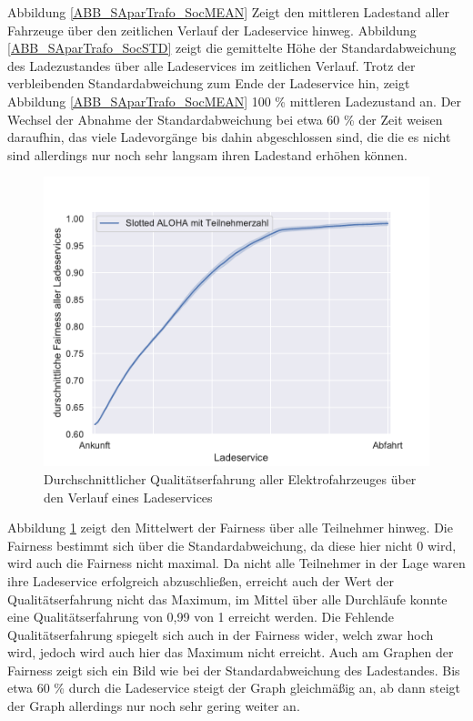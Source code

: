 Abbildung \ref{ABB_SAparTrafo_SocMEAN} Zeigt den mittleren Ladestand aller Fahrzeuge über den zeitlichen Verlauf der Ladeservice hinweg. Abbildung \ref{ABB_SAparTrafo_SocSTD} zeigt die gemittelte Höhe der Standardabweichung des Ladezustandes über alle Ladeservices im zeitlichen Verlauf. Trotz der verbleibenden Standardabweichung zum Ende der Ladeservice hin, zeigt Abbildung \ref{ABB_SAparTrafo_SocMEAN} 100 \% mittleren Ladezustand an. Der Wechsel der  Abnahme der Standardabweichung bei etwa 60 \% der Zeit weisen daraufhin, das viele Ladevorgänge bis dahin abgeschlossen sind, die die es nicht sind allerdings nur noch sehr langsam ihren Ladestand erhöhen können. \\
\begin{figure}[htb]
\centering
	\includegraphics[scale=0.6]{img/Sa_par_trafo/SlottedAloha_participants_VDE_tau_trafo_15_qoe.pdf}
	\caption{Durchschnittlicher Qualitätserfahrung aller Elektrofahrzeuges über den Verlauf eines Ladeservices}
	\label{Abb_SAparTrafo_Fairness}
\end{figure}
Abbildung \ref{Abb_SAparTrafo_Fairness} zeigt den Mittelwert der Fairness über alle Teilnehmer hinweg. Die Fairness bestimmt sich über die Standardabweichung, da diese hier nicht 0 wird, wird auch die Fairness nicht maximal. Da nicht alle Teilnehmer in der Lage waren ihre Ladeservice erfolgreich abzuschließen, erreicht auch der Wert der Qualitätserfahrung nicht das Maximum, im Mittel über alle Durchläufe konnte eine Qualitätserfahrung von 0,99 von 1 erreicht werden. Die Fehlende Qualitätserfahrung spiegelt sich auch in der Fairness wider, welch zwar hoch wird, jedoch wird auch hier das Maximum nicht erreicht. Auch am Graphen der Fairness zeigt sich ein Bild wie bei der Standardabweichung des Ladestandes. Bis etwa 60 \% durch die Ladeservice steigt der Graph gleichmäßig an, ab dann steigt der Graph allerdings nur noch sehr gering weiter an. 

